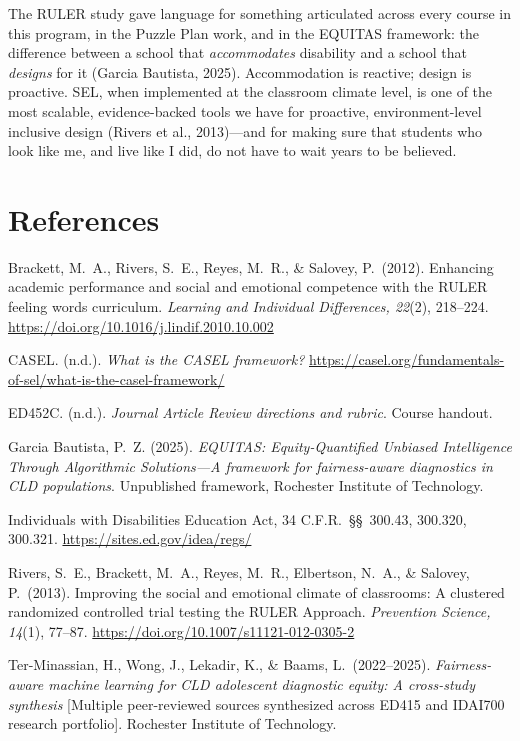 \documentclass[11pt]{article}
\begin{document}
\begin{ReflectionBox}
The RULER study gave language for something articulated across every course in this program, in the Puzzle Plan work, and in the EQUITAS framework: the difference between a school that \textit{accommodates} disability and a school that \textit{designs} for it (Garcia Bautista, 2025). Accommodation is reactive; design is proactive. SEL, when implemented at the classroom climate level, is one of the most scalable, evidence-backed tools we have for proactive, environment-level inclusive design (Rivers et al., 2013)---and for making sure that students who look like me, and live like I did, do not have to wait years to be believed.
\end{ReflectionBox}

\newpage
\section*{References}
\small
Brackett, M.\ A., Rivers, S.\ E., Reyes, M.\ R., \& Salovey, P.\ (2012). Enhancing academic performance and social and emotional competence with the RULER feeling words curriculum. \textit{Learning and Individual Differences, 22}(2), 218--224. \url{https://doi.org/10.1016/j.lindif.2010.10.002}

CASEL. (n.d.). \textit{What is the CASEL framework?} \url{https://casel.org/fundamentals-of-sel/what-is-the-casel-framework/}

ED452C. (n.d.). \textit{Journal Article Review directions and rubric}. Course handout.

Garcia Bautista, P.\ Z. (2025). \textit{EQUITAS: Equity-Quantified Unbiased Intelligence Through Algorithmic Solutions---A framework for fairness-aware diagnostics in CLD populations}. Unpublished framework, Rochester Institute of Technology.

Individuals with Disabilities Education Act, 34 C.F.R.\ \S\S\ 300.43, 300.320, 300.321. \url{https://sites.ed.gov/idea/regs/}

Rivers, S.\ E., Brackett, M.\ A., Reyes, M.\ R., Elbertson, N.\ A., \& Salovey, P.\ (2013). Improving the social and emotional climate of classrooms: A clustered randomized controlled trial testing the RULER Approach. \textit{Prevention Science, 14}(1), 77--87. \url{https://doi.org/10.1007/s11121-012-0305-2}

Ter-Minassian, H., Wong, J., Lekadir, K., \& Baams, L.\ (2022--2025). \textit{Fairness-aware machine learning for CLD adolescent diagnostic equity: A cross-study synthesis} [Multiple peer-reviewed sources synthesized across ED415 and IDAI700 research portfolio]. Rochester Institute of Technology.
\end{document}
